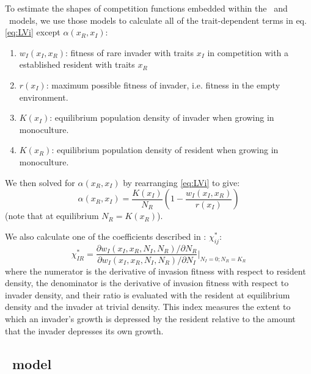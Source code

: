 \documentclass[a4paper,11pt]{article}
\begin{document}
To estimate the shapes of competition functions embedded within the
\Rstar\ and \plant\ models, we use those models to calculate all of
the trait-dependent terms in eq. \ref{eq:LVi} except $\alpha(x_R,
x_I)$:
\begin{enumerate}
\item $w_I(x_I, x_R)$: fitness of rare invader with traits $x_I$  in
  competition with a established resident with traits $x_R$
\item $r(x_I)$: maximum possible fitness of invader, i.e. fitness in
  the empty environment.
\item $K(x_I)$: equilibrium population density of invader when growing
  in monoculture.
\item $K(x_R)$: equilibrium population density of resident when
  growing in monoculture.
\end{enumerate}
We then solved for $\alpha(x_R, x_I)$ by rearranging  \ref{eq:LVi} to give:
\begin{equation}
  \label{eq:alpha}
  \alpha(x_R, x_I) = \frac{K(x_I)}{N_R}
  \left(1 - \frac{w_I(x_I, x_R)}{r(x_I)}\right)
\end{equation}
(note that at equilibrium $N_R = K(x_R)$).


We also calculate one of the coefficients described in
\citet{Abrams-2008}: $\chi_{ij}^{*}$:
%
\begin{equation}
  \label{eq:abrams-coef}
  \chi_{IR}^{*} =
  \frac{\partial w_I(x_I, x_R, N_I, N_R) /  \partial N_R}%
  {\partial w_I(x_I, x_R, N_I, N_R) / \partial N_I}
  \bigg|_{N_I=0; N_R=K_{R}}
\end{equation}
%
where the numerator is the derivative of invasion fitness with respect
to resident density, the denominator is the derivative of invasion
fitness with respect to invader density, and their ratio is evaluated with the resident at equilibrium density and the invader at
trivial density.  This index measures the extent to which an invader's growth is depressed by the resident relative to the amount
that the invader depresses its own growth.

\subsection{\Rstar\ model}
\end{document}
